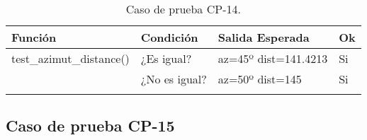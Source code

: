 \begin{longtable}[]{@{}llll@{}}
\toprule
\begin{minipage}[b]{0.6\columnwidth}\raggedright\strut
Función\strut
\end{minipage} & \begin{minipage}[b]{0.20\columnwidth}\raggedright\strut
Condición\strut
\end{minipage} & \begin{minipage}[b]{0.15\columnwidth}\raggedright\strut
Salida Esperada\strut
\end{minipage} & \begin{minipage}[b]{0.05\columnwidth}\raggedright\strut
Ok\strut
\end{minipage}\tabularnewline
\midrule
\endhead
\begin{minipage}[t]{0.6\columnwidth}\raggedright\strut
test\_azimut\_distance()\strut
\end{minipage} & \begin{minipage}[t]{0.20\columnwidth}\raggedright\strut
¿Es igual?\strut
\end{minipage} & \begin{minipage}[t]{0.15\columnwidth}\raggedright\strut
az=45º dist=141.4213\strut
\end{minipage} & \begin{minipage}[t]{0.05\columnwidth}\raggedright\strut
Si\strut
\end{minipage}\tabularnewline
\begin{minipage}[t]{0.6\columnwidth}\raggedright\strut
\strut
\end{minipage} & \begin{minipage}[t]{0.20\columnwidth}\raggedright\strut
¿No es igual?\strut
\end{minipage} & \begin{minipage}[t]{0.15\columnwidth}\raggedright\strut
az=50º dist=145\strut
\end{minipage} & \begin{minipage}[t]{0.05\columnwidth}\raggedright\strut
Si\strut
\end{minipage}\tabularnewline

\bottomrule
\caption{Caso de prueba CP-14.}
\end{longtable}



\subsection{Caso de prueba CP-15}

